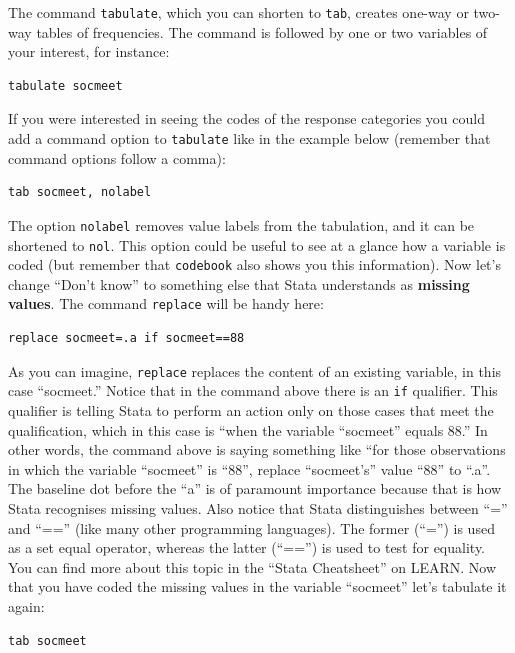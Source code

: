 \documentclass{article}
\begin{document}
The command \texttt{tabulate}, which you can shorten to \texttt{tab}, creates one-way or two-way tables of frequencies. The command is followed by one or two variables of your interest, for instance:

\begin{lstlisting}
tabulate socmeet
\end{lstlisting}

If you were interested in seeing the codes of the response categories you could add a command option to \texttt{tabulate} like in the example below (remember that command options follow a comma):

\begin{lstlisting}
tab socmeet, nolabel
\end{lstlisting}

The option \texttt{nolabel} removes value labels from the tabulation, and it can be shortened to \texttt{nol}. This option could be useful to see at a glance how a variable is coded (but remember that \texttt{codebook} also shows you this information). Now let's change ``Don't know'' to something else that Stata understands as \textbf{missing values}. The command \texttt{replace} will be handy here:

\begin{lstlisting}
replace socmeet=.a if socmeet==88
\end{lstlisting}

As you can imagine, \texttt{replace} replaces the content of an existing variable, in this case ``socmeet.'' Notice that in the command above there is an \texttt{if} qualifier. This qualifier is telling Stata to perform an action only on those cases that meet the qualification, which in this case is ``when the variable ``socmeet'' equals 88.'' In other words, the command above is saying something like ``for those observations in which the variable ``socmeet'' is ``88'', replace ``socmeet's'' value ``88'' to ``.a''. The baseline dot before the ``a'' is of paramount importance because that is how Stata recognises missing values. Also notice that Stata distinguishes between ``='' and ``=='' (like many other programming languages). The former (``='') is used as a set equal operator, whereas the latter (``=='') is used to test for equality. You can find more about this topic in the ``Stata Cheatsheet'' on LEARN. Now that you have coded the missing values in the variable ``socmeet'' let's tabulate it again:

\begin{lstlisting}
tab socmeet
\end{lstlisting}
\end{document}
